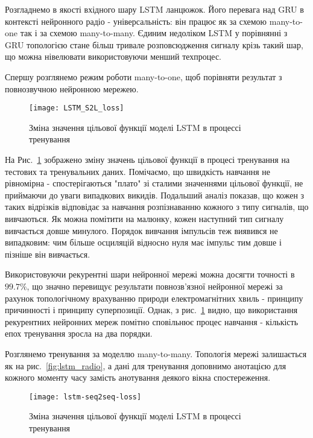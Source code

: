 Розгладнемо в якості вхідного шару LSTM ланцюжок. Його перевага над 
GRU в контексті нейронного радіо - універсальність: він працює як за схемою
many-to-one так і за схемою many-to-many. Єдиним недоліком LSTM у порівнянні 
з GRU топологією стане більш тривале розповсюдження сигналу крізь такий шар,
що можна нівелювати використовуючи менший техпроцес.

Спершу розглянемо режим роботи many-to-one, щоб порівняти результат з 
повнозвучною нейронною мережею.

\begin{figure}[htbp] \begin{center}
\texttt{[image: LSTM\_S2L\_loss]}
\caption{Зміна значення цільової функції моделі LSTM 
в процессі тренування} \label{fig:lstm_loss}
\end{center} \end{figure}

На Рис.~\ref{fig:lstm_loss} зображено зміну значень цільової функції в процесі
тренування на тестових та тренувальних даних. Помічаємо, що швидкість навчання 
не рівномірна - спостерігаються "плато" зі сталими значеннями цільової функції,
не приймаючи до уваги випадкових викидів. Подальший аналіз показав, що кожен з 
таких відрізків відповідає за навчання розпізнаванню кожного з типу сигналів, 
що вивчаються. Як можна помітити на малюнку, кожен наступний тип сигналу 
вивчається довше минулого. Порядок вивчання імпульсів теж виявився не 
випадковим: чим більше осциляцій відносно нуля має імпульс тим довше і 
пізніше він вивчається.

Використовуючи рекурентні шари нейронної мережі можна досягти точності в 
$ 99.7\% $, що значно перевищує результати повнозв'язної нейронної мережі 
за рахунок топологічному врахуванню природи електромагнітних хвиль - 
принципу причинності і принципу суперпозиції. Однак, з 
рис.~\ref{fig:lstm_loss} видно, що використання рекурентних нейронних мереж 
помітно сповільнює процес навчання - кількість епох тренування зросла на 
два порядки.

Розглянемо тренування за моделлю many-to-many. Топологія мережі залишається 
як на рис.~\ref{fig:lstm_radio}, а дані для тренування доповнимо анотацією 
для кожного моменту часу замість анотування деякого вікна спостереження.

\begin{figure}[htbp] \begin{center}
\texttt{[image: lstm-seq2seq-loss]}
\caption{Зміна значення цільової функції моделі LSTM
в процессі тренування} \label{fig:lstm_seq2seq_loss}
\end{center} \end{figure}

